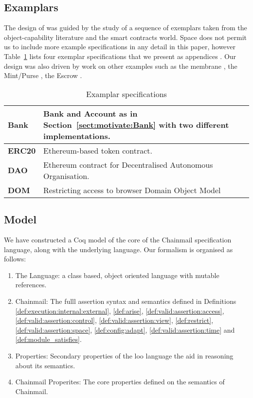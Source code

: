 

\subsection{Examplars}

The design of \Chainmail was guided by the study of a sequence of
exemplars taken from the object-capability literature and the smart
contracts world.  
Space does not permit us to include more example specifications in any
detail in this paper, however 
%
Table~\ref{table} lists four exemplar specifications that we present as
appendices \cite{examples}. Our design was also driven by work on other
examples such as the membrane \cite{membranesJavascript},
the Mint/Purse \cite{MillerPhD}, the Escrow \cite{proxiesECOOP2013,swapsies}.

\begin{table}
  \begin{tabular}{|l|l|}
    \hline
\textbf{Bank} \cite{arnd18} & Bank and Account as in
Section~\ref{sect:motivate:Bank} with two different implementations.\\
\hline
\textbf{ERC20} \cite{ERC20} &   Ethereum-based token contract.\\
\hline
\textbf{DAO} \cite{Dao,DaoBug} & Ethereum contract for Decentralised Autonomous
Organisation.\\
\hline
\textbf{DOM} \cite{dd,ddd} & Restricting access to browser Domain Object Model\\
    \hline
  \end{tabular}
  \caption{Examplar specifications \cite{examples}}
  \label{table}
\end{table}





\subsection{Model}


We have constructed a Coq model \cite{examples} of the core of the Chainmail
specification language, along with the underlying \LangOO language.
Our formalism is organised as follows:
\begin{enumerate}
\item
The \LangOO Language: a class based, object oriented language with mutable references.
\item
Chainmail: The fulll assertion syntax and semantics defined in Definitions \ref{def:execution:internal:external}, \ref{def:arise}, \ref{def:valid:assertion:access}, \ref{def:valid:assertion:control}, \ref{def:valid:assertion:view}, \ref{def:restrict}, \ref{def:valid:assertion:space}, \ref{def:config:adapt}, \ref{def:valid:assertion:time} and \ref{def:module_satisfies}.
\item
\LangOO Properties: Secondary properties of the loo language the aid in reasoning about its semantics.
\item
Chainmail Properites: The core properties defined on the semantics of Chainmail.
\end{enumerate}

